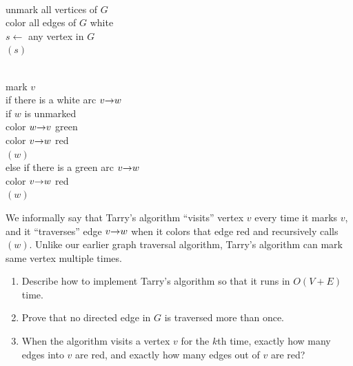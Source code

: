 \begin{exercises}
\begin{enumerate}[label=\arabic*.,ref=\thechapter.\arabic*,leftmargin=*,align=left,itemsep=1.5ex plus 0.5ex,start=0]
\begin{center}
\begin{minipage}[c]{0.37\linewidth}
\begin{pseudocode}
\\
unmark all vertices of $G$\\
color all edges of $G$ white\\
$s \gets$ any vertex in $G$\\
$(s)$
\end{pseudocode}
\end{minipage}\hfill
\begin{minipage}[c]{0.6\linewidth}
\begin{pseudocode}
\\
mark $v$ \\
if there is a white arc $v\mathord{\rightarrow}w$\\
\Indent if $w$ is unmarked\\
\Indent\Indent color $w\mathord{\rightarrow}v$ {\color{JEgreen!75!black}green}\\
\Indent color $v\mathord{\rightarrow}w$ {\color{JEred}red} \\
\Indent {}$(w)$\\
else if there is a {\color{JEgreen!75!black}green} arc $v\mathord{\rightarrow}w$\\
\Indent color $v\mathord{\rightarrow}w$ {\color{JEred}red} \\
\Indent {}$(w)$
\end{pseudocode}
\end{minipage}
\end{center}
We informally say that Tarry’s algorithm “visits” vertex $v$ every time it marks $v$, and it “traverses” edge $v\mathord{\rightarrow}w$ when it colors that edge \textcolor{JEred}{red} and recursively calls $(w)$.
Unlike our earlier graph traversal algorithm, Tarry’s algorithm can mark same vertex multiple times.
\begin{enumerate}
\item Describe how to implement Tarry’s algorithm so that it runs in $O(V+E)$ time.
\item Prove that no directed edge in $G$ is traversed more than once.
\item When the algorithm visits a vertex $v$ for the $k$th time, exactly how many edges into $v$ are \textcolor{JEred}{red}, and exactly how many edges out of $v$ are \textcolor{JEred}{red}?

\end{enumerate}
\end{enumerate}
\end{exercises}

